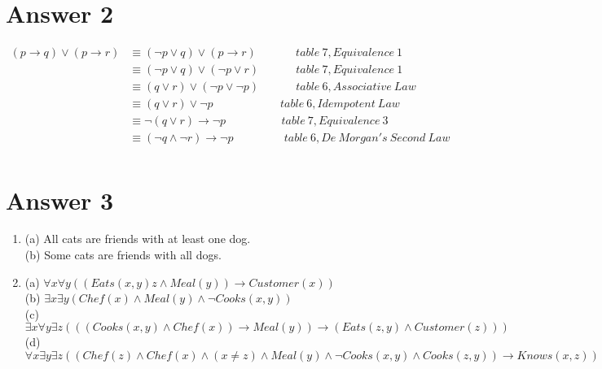 \documentclass[12pt]{article}
\begin{document}
\section*{Answer 2}
\begin{equation*} 
\begin{split}
 (p \rightarrow q) \vee (p \rightarrow r) &\equiv (\neg p \vee q) \vee (p \rightarrow r)\ \qquad \quad \ table\ 7, Equivalence \ 1\\
 &\equiv (\neg p \vee q) \vee (\neg p \vee r)\ \quad \quad \quad table\ 7, Equivalence\ 1\\
 &\equiv (q \vee r) \vee (\neg p \vee \neg p) \quad \quad \quad \ table\ 6, Associative\ Law \\ &\equiv (q \vee r) \vee \neg p \ \ \ \quad \qquad \qquad \ table\ 6, Idempotent\ Law\\ &\equiv \neg(q \vee r) \rightarrow \neg p \ \ \ \quad \qquad \quad \ table\ 7, Equivalence\ 3\\ &\equiv (\neg q \wedge \neg r) \rightarrow \neg p \ \qquad \qquad \ table\ 6, De\ Morgan's\ Second\ Law\\
\end{split}
\end{equation*} 
\newpage
\section*{Answer 3}
\begin{enumerate}

	\item
	(a) All cats are friends with at least one dog.\\
	(b) Some cats are friends with all dogs.\\
	\item 
	(a) $\forall x \forall y ((Eats(x,y) z\wedge Meal(y)) \rightarrow Customer(x)) $ \\
	(b) $\exists x \exists y (Chef(x) \wedge Meal(y) \wedge \neg Cooks(x,y))$\\
	(c) $\exists x \forall y \exists z(((Cooks(x,y) \wedge Chef(x)) \rightarrow Meal(y)) \rightarrow (Eats(z,y) \wedge Customer(z)))$\\
	(d) $\forall x \exists y \exists z ((Chef(z) \wedge Chef(x) \wedge (x \neq z) \wedge Meal(y) \wedge \neg Cooks(x,y) \wedge Cooks(z,y)) \rightarrow Knows(x,z))$\\

\end{enumerate}
\end{document}
